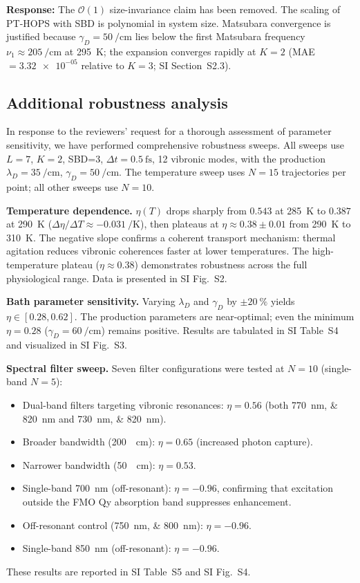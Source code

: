 \documentclass[11pt]{article}
\begin{document}
\textbf{Response:} The $\mathcal{O}(1)$ size-invariance claim has been removed. The scaling of PT-HOPS with SBD is polynomial in system size. Matsubara convergence is justified because $\gamma_D = \SI{50}{\per\centi\meter}$ lies below the first Matsubara frequency $\nu_1 \approx \SI{205}{\per\centi\meter}$ at \SI{295}{\kelvin}; the expansion converges rapidly at $K=2$ (MAE $= \num{3.32e-05}$ relative to $K=3$; SI Section~S2.3).

\subsection*{Additional robustness analysis}

In response to the reviewers' request for a thorough assessment of parameter sensitivity, we have performed comprehensive robustness sweeps. All sweeps use $L=7$, $K=2$, SBD=3, $\Delta t = \SI{0.5}{\femto\second}$, 12 vibronic modes, with the production $\lambda_D = \SI{35}{\per\centi\meter}$, $\gamma_D = \SI{50}{\per\centi\meter}$. The temperature sweep uses $N=15$ trajectories per point; all other sweeps use $N=10$.

\textbf{Temperature dependence.} $\eta(T)$ drops sharply from $\num{0.543}$ at \SI{285}{\kelvin} to $\num{0.387}$ at \SI{290}{\kelvin} ($\Delta\eta/\Delta T \approx \SI{-0.031}{\per\kelvin}$), then plateaus at $\eta \approx \num{0.38}\pm\num{0.01}$ from \SI{290}{\kelvin} to \SI{310}{\kelvin}. The negative slope confirms a coherent transport mechanism: thermal agitation reduces vibronic coherences faster at lower temperatures. The high-temperature plateau ($\eta \approx \num{0.38}$) demonstrates robustness across the full physiological range. Data is presented in SI Fig.~S2.

\textbf{Bath parameter sensitivity.} Varying $\lambda_D$ and $\gamma_D$ by $\pm\SI{20}{\percent}$ yields $\eta \in [\num{0.28}, \num{0.62}]$. The production parameters are near-optimal; even the minimum $\eta = \num{0.28}$ ($\gamma_D = \SI{60}{\per\centi\meter}$) remains positive. Results are tabulated in SI Table~S4 and visualized in SI Fig.~S3.

\textbf{Spectral filter sweep.} Seven filter configurations were tested at $N=10$ (single-band $N=5$):
\begin{itemize}
    \item Dual-band filters targeting vibronic resonances: $\eta = \num{0.56}$ (both \SIlist{770;820}{\nano\meter} and \SIlist{730;820}{\nano\meter}).
    \item Broader bandwidth (\SI{200}{\per\centi\meter}): $\eta = \num{0.65}$ (increased photon capture).
    \item Narrower bandwidth (\SI{50}{\per\centi\meter}): $\eta = \num{0.53}$.
    \item Single-band 700~nm (off-resonant): $\eta = \num{-0.96}$, confirming that excitation outside the FMO Qy absorption band suppresses enhancement.
    \item Off-resonant control (\SIlist{750;800}{\nano\meter}): $\eta = \num{-0.96}$.
    \item Single-band 850~nm (off-resonant): $\eta = \num{-0.96}$.
\end{itemize}
These results are reported in SI Table~S5 and SI Fig.~S4.
\end{document}
